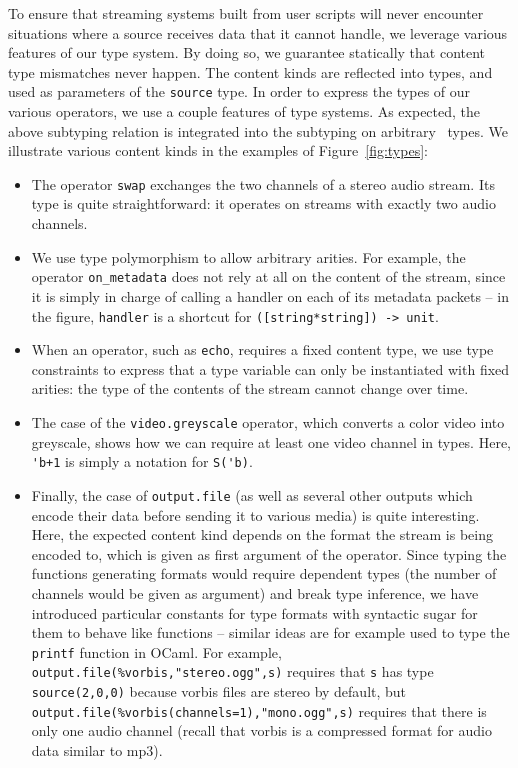 To ensure that streaming systems built from user scripts will never
encounter situations where a source receives data that it cannot handle,
we leverage various features of our type system.
By doing so, we guarantee statically that content type mismatches never happen.
The content kinds are reflected into types,
and used as parameters of the \texttt{source} type.
In order to express the types of our various operators,
we use a couple features of type systems.
As expected, the above subtyping relation is integrated into
the subtyping on arbitrary \liquidsoap\ types.
We illustrate various content kinds in the examples of Figure~\ref{fig:types}:
\begin{itemize}
\item The operator \texttt{swap} exchanges the two channels of a stereo audio
  stream. Its type is quite straightforward: it operates on streams with exactly
  two audio channels.
\item
  We use type polymorphism to allow arbitrary arities.
  For example, the operator \verb.on_metadata. does not rely
  at all on the content of the stream, since it is simply in
  charge of calling a handler on each of its metadata packets --
  in the figure, \verb.handler. is a shortcut for
  \verb.([string*string]) -> unit..
\item When an operator, such as \verb.echo., requires a fixed content type, we
  use type constraints to express that a type variable can only be instantiated
  with fixed arities: the type of the contents of the stream cannot change over
  time.
\item The case of the \texttt{video.greyscale} operator, which converts a color
  video into greyscale, shows how we can require at least one video channel in
  types.  Here, \verb.'b+1. is simply a notation for \verb.S('b)..
\item Finally, the case of \verb#output.file# (as well as several other outputs
  which encode their data before sending it to various media) is quite
  interesting. Here, the expected content kind depends on the format the stream
  is being encoded to, which is given as first argument of the operator. Since
  typing the functions generating formats would require dependent types (the
  number of channels would be given as argument) and break type inference, we
  have introduced particular constants for type formats with syntactic sugar for
  them to behave like functions -- similar ideas are for example used to type
  the \texttt{printf} function in OCaml. For example,
  \verb$output.file(%vorbis,"stereo.ogg",s)$ requires that
  \verb.s. has type \verb.source(2,0,0). because vorbis files are stereo by
  default, but \verb$output.file(%vorbis(channels=1),"mono.ogg",s)$
  requires that there is only one audio channel (recall that vorbis is a
  compressed format for audio data similar to mp3).
\end{itemize}

